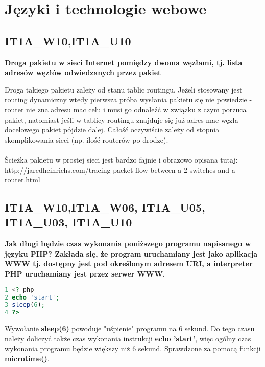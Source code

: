 \chapter{Języki i technologie webowe}
\PartialToc
\section{IT1A\_W10,IT1A\_U10}
\textbf{Droga pakietu w sieci Internet pomiędzy dwoma
węzłami, tj. lista adresów węzłów odwiedzanych przez pakiet}

Droga takiego pakietu zależy od stanu tablic routingu. Jeżeli stosowany jest routing dynamiczny wtedy pierwsza próba wysłania pakietu się nie powiedzie - router nie zna adresu mac celu i musi go odnaleźć w związku z czym porzuca pakiet, natomiast jeśli w tablicy routingu znajduje się już adres mac węzła docelowego pakiet pójdzie dalej. Całość oczywiście zależy od stopnia skomplikowania sieci (np. ilość routerów po drodze).
\\
\\
Ścieżka pakietu w prostej sieci jest bardzo fajnie i obrazowo opisana tutaj:\\
http://jaredheinrichs.com/tracing-packet-flow-between-a-2-switches-and-a-router.html


\vspace{0.4cm}
\noindent 


\section{IT1A\_W10,IT1A\_W06, IT1A\_U05, IT1A\_U03, IT1A\_U10 }
\textbf{Jak długi będzie czas wykonania poniższego programu napisanego w języku PHP? Zakłada się, że program uruchamiany jest jako aplikacja WWW tj. dostępny jest pod określonym adresem URI, a interpreter PHP uruchamiany jest przez serwer WWW.}

\begin{lstlisting}[language=php]
1 <? php
2 echo 'start';
3 sleep(6);
4 ?>

\end{lstlisting}

Wywołanie \textbf{sleep(6)} powoduje "uśpienie" programu na 6 sekund. Do tego czasu należy doliczyć także czas wykonania instrukcji \textbf{echo 'start'}, więc ogólny czas wykonania programu będzie większy niż 6 sekund. Sprawdzone za pomocą funkcji \textbf{microtime()}.

